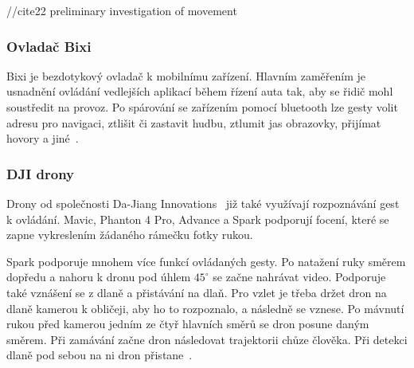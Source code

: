 //cite{22} preliminary investigation of movement

\subsubsection{Ovladač Bixi}
Bixi je bezdotykový ovladač k mobilnímu zařízení. Hlavním zaměřením je usnadnění ovládání vedlejších aplikací během řízení auta tak, aby se řidič mohl soustředit na provoz. Po spárování se zařízením pomocí bluetooth lze gesty volit adresu pro navigaci, ztlišit či zastavit hudbu, ztlumit jas obrazovky, přijímat hovory a jiné~\cite{bixi}.

\subsubsection{DJI drony}
Drony od společnosti Da-Jiang Innovations~\cite{dji} již také využívají rozpoznávání gest k ovládání. Mavic, Phanton 4 Pro, Advance  a Spark podporují focení, které se zapne vykreslením žádaného rámečku fotky rukou.

Spark podporuje mnohem více funkcí ovládaných gesty. Po natažení ruky směrem dopředu a nahoru k dronu pod úhlem $ 45^\circ $ se začne nahrávat video. Podporuje také vznášení se z dlaně a přistávání na dlaň. Pro vzlet je třeba držet dron na dlaně kamerou k obličeji, aby ho to rozpoznalo, a následně se vznese. Po mávnutí rukou před kamerou jedním ze čtyř hlavních směrů se dron posune daným směrem. Při zamávání začne dron následovat trajektorii chůze člověka. Při detekci dlaně pod sebou na ni dron přistane~\cite{heliguy}.

\endinput
